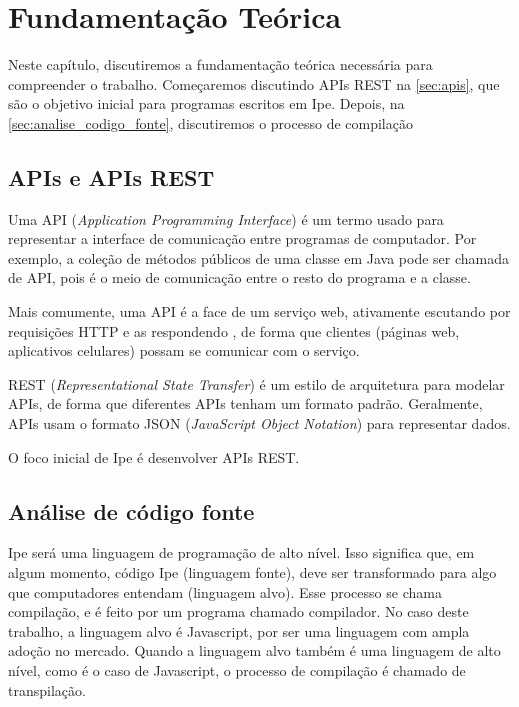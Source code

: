
\chapter{Fundamentação Teórica}

Neste capítulo, discutiremos a fundamentação teórica necessária para compreender
o trabalho. Começaremos discutindo APIs REST na \autoref{sec:apis}, que são o
objetivo inicial para programas escritos em Ipe. Depois, na \autoref{sec:analise_codigo_fonte},
discutiremos o processo de compilação

\section{APIs e APIs REST}\label{sec:apis}

Uma API (\textit{Application Programming Interface}) é um termo usado para representar
a interface de comunicação entre programas de computador. Por exemplo, a coleção
de métodos públicos de uma classe em Java pode ser chamada de API, pois é o
meio de comunicação entre o resto do programa e a classe.

Mais comumente, uma API é a face de um serviço web, ativamente escutando por
requisições HTTP e as respondendo \cite{restapirulebook}, de forma que clientes
(páginas web, aplicativos celulares) possam se comunicar com o serviço.

REST (\textit{Representational State Transfer}) é um estilo de arquitetura para
modelar APIs, de forma que diferentes APIs tenham um formato padrão. Geralmente,
APIs usam o formato JSON (\textit{JavaScript Object Notation}) para representar
dados.

O foco inicial de Ipe é desenvolver APIs REST.

\section{Análise de código fonte}\label{sec:analise_codigo_fonte}

Ipe será uma linguagem de programação de alto nível. Isso significa que, em algum
momento, código Ipe (linguagem fonte), deve ser transformado para algo que
computadores entendam (linguagem alvo). Esse processo se chama compilação, e é
feito por um programa chamado compilador. No caso deste trabalho, a linguagem
alvo é Javascript, por ser uma linguagem com ampla adoção no mercado. Quando a
linguagem alvo também é uma linguagem de alto nível, como é o caso de Javascript,
o processo de compilação é chamado de transpilação.

